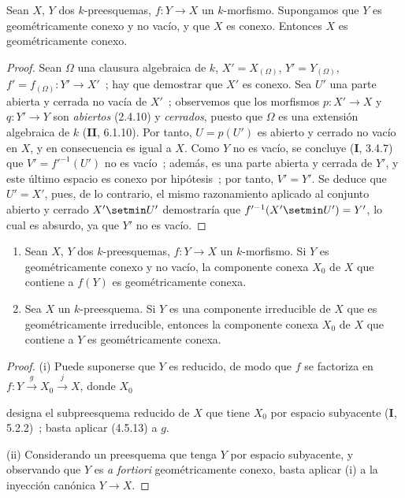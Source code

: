 \begin{proposition}[4.5.13]
\label{IV.2.4.5.13-fr}
Sean $X$, $Y$ dos $k$-preesquemas, $f:Y\to X$ un $k$-morfismo. Supongamos que
$Y$ es geométricamente conexo y no vacío, y que $X$ es conexo. Entonces $X$ es
geométricamente conexo.
\end{proposition}

\begin{proof}
Sean $\Omega$ una clausura algebraica de $k$, $X'=X_{(\Omega)}$,
$Y'=Y_{(\Omega)}$, $f'=f_{(\Omega)}:Y'\to X'$~; hay que demostrar que $X'$ es
conexo. Sea $U'$ una parte abierta y cerrada no vacía de $X'$~; observemos que
los morfismos $p:X'\to X$ y $q:Y'\to Y$ son \emph{abiertos} (2.4.10) y
\emph{cerrados}, puesto que $\Omega$ es una extensión algebraica de $k$
(\textbf{II}, 6.1.10). Por tanto, $U=p(U')$ es abierto y cerrado no vacío en $X$, y en
consecuencia es igual a $X$. Como $Y$ no es vacío, se concluye (\textbf I, 3.4.7) que
$V'=f'^{-1}(U')$ no es vacío~; además, es una parte abierta y cerrada de $Y'$,
y este último espacio es conexo por hipótesis~; por tanto, $V'=Y'$. Se deduce
que $U'=X'$, pues, de lo contrario, el mismo razonamiento aplicado al conjunto
abierto y cerrado $X'\setmin U'$ demostraría que $f'^{-1}(X'\setmin U')=Y'$, lo cual es
absurdo, ya que $Y'$ no es vacío.
\end{proof}

\begin{corollary}[4.5.13.1]
\label{IV.2.4.5.13.1-fr}
\begin{enumerate}
\item[\textup{(i)}] Sean $X$, $Y$ dos $k$-preesquemas, $f:Y\to X$ un $k$-morfismo.
Si $Y$ es geométricamente conexo y no vacío, la componente conexa $X_0$ de
$X$ que contiene a $f(Y)$ es geométricamente conexa.
\item[\textup{(ii)}] Sea $X$ un $k$-preesquema. Si $Y$ es una componente irreducible
de $X$ que es geométricamente irreducible, entonces la componente conexa $X_0$
de $X$ que contiene a $Y$ es geométricamente conexa.
\end{enumerate}
\end{corollary}

\begin{proof}
(i) Puede suponerse que $Y$ es reducido, de modo que $f$ se factoriza en
$f:Y\xrightarrow{g}X_0\xrightarrow{j}X$, donde $X_0$


designa el subpreesquema reducido de $X$ que tiene $X_0$ por espacio
subyacente (\textbf I, 5.2.2)~; basta aplicar (4.5.13) a $g$.

(ii) Considerando un preesquema que tenga $Y$ por espacio subyacente,
y observando que $Y$ es \emph{a fortiori} geométricamente conexo, basta aplicar
(i) a la inyección canónica $Y\to X$.
\end{proof}

